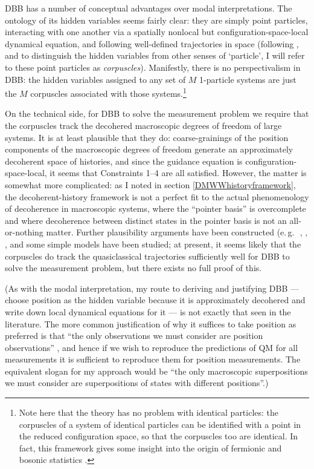 \documentclass[12pt]{article}
\newcommand{\eg}{\mbox{e.\,g.\,\ }}
\begin{document}
DBB has a number of conceptual advantages over modal interpretations. The ontology of its hidden variables seems fairly clear: they are simply point particles, interacting with one another via a spatially nonlocal but configuration-space-local dynamical equation, and following well-defined trajectories in space (following , and to distinguish the hidden variables from other senses of `particle', I will refer to these point particles as \emph{corpuscles}). Manifestly, there is no perspectivalism in DBB: the hidden variables assigned to any set of $M$ 1-particle systems are just the $M$ corpuscles associated with those systems.\footnote{Note here that the theory has no problem with identical particles: the corpuscles of a system of identical particles can be identified with a point in the reduced configuration space, so that the corpuscles too are identical. In fact, this framework gives some insight into the origin of fermionic and bosonic statistics \cite{brownstatistics}.}

On the technical side, for DBB to solve the measurement problem we require that the corpuscles track the decohered macroscopic degrees of freedom of large systems. It is at least plausible that they do: coarse-grainings of the position components of the macroscopic degrees of freedom generate an approximately decoherent space of histories, and since the guidance equation is configuration-space-local, it seems that Constraints 1--4 are all satisfied. However, the matter is somewhat more complicated: as I noted in section \ref{DMWWhistoryframework}, the decoherent-history framework is not a perfect fit to the actual phenomenology of decoherence in macroscopic systems, where the ``pointer basis'' is overcomplete and where decoherence between distinct states in the pointer basis is not an all-or-nothing matter. Further plausibility arguments have been constructed (\eg {}, , , and some simple models have been studied; at present, it seems likely that the corpuscles do track the quasiclassical trajectories sufficiently well for DBB to solve the measurement problem, but there exists no full proof of this.

(As with the modal interpretation, my route to deriving and justifying DBB --- choose position as the hidden variable because it is approximately decohered and write down local dynamical equations for it --- is not exactly that seen in the literature. The more common justification of why it suffices to take  position as preferred is that ``the only observations we must consider are position observations'' \cite{bellimpossible}, and hence if we wish to reproduce the predictions of QM for all measurements it is sufficient to reproduce them for position measurements. The equivalent slogan for my approach would be ``the only macroscopic superpositions we must consider are superpositions of states with different positions''.)
\end{document}
